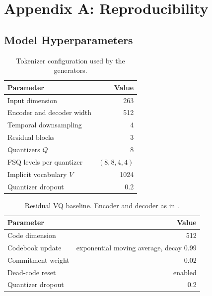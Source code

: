 \chapter{Appendix A: Reproducibility}
\label{chap:appendix_reproducibility}

\section{Model Hyperparameters}
\label{sec:app_hyper}

\begin{table}[H]
\centering
\caption{Tokenizer configuration used by the generators.}
\label{tab:app_tokenizer}
\begin{tabular}{lr}
\toprule
Parameter & Value \\
\midrule
Input dimension & 263 \\
Encoder and decoder width & 512 \\
Temporal downsampling & 4 \\
Residual blocks & 3 \\
Quantizers $Q$ & 8 \\
FSQ levels per quantizer & $(8, 8, 4, 4)$ \\
Implicit vocabulary $V$ & 1024 \\
Quantizer dropout & 0.2 \\
\bottomrule
\end{tabular}
\end{table}

\begin{table}[H]
\centering
\caption{Residual VQ baseline. Encoder and decoder as in .}
\label{tab:app_rvq}
\begin{tabular}{lr}
\toprule
Parameter & Value \\
\midrule
Code dimension & 512 \\
Codebook update & exponential moving average, decay 0.99 \\
Commitment weight & 0.02 \\
Dead-code reset & enabled \\
Quantizer dropout & 0.2 \\
\bottomrule
\end{tabular}
\end{table}


